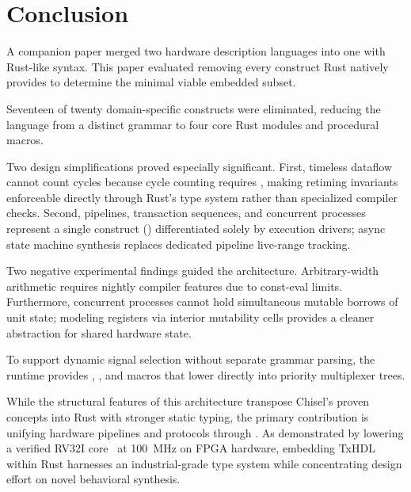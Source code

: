 \section{Conclusion}
\label{sec:e-conclusion}

A companion paper merged two hardware description languages into one with
Rust-like syntax. This paper evaluated removing every construct Rust natively
provides to determine the minimal viable embedded subset.

Seventeen of twenty domain-specific constructs were eliminated, reducing the
language from a distinct grammar to four core Rust modules and procedural macros.

Two design simplifications proved especially significant. First, timeless dataflow
cannot count cycles because cycle counting requires , making
retiming invariants enforceable directly through Rust's type system rather than
specialized compiler checks. Second, pipelines, transaction sequences, and
concurrent processes represent a single construct () differentiated
solely by execution drivers; async state machine synthesis replaces dedicated
pipeline live-range tracking.

Two negative experimental findings guided the architecture. Arbitrary-width
arithmetic requires nightly compiler features due to const-eval limits. Furthermore,
concurrent processes cannot hold simultaneous mutable borrows of unit state;
modeling registers via interior mutability cells provides a cleaner abstraction
for shared hardware state.

To support dynamic signal selection without separate grammar parsing, the
runtime provides , , and  macros that
lower directly into priority multiplexer trees.

While the structural features of this architecture transpose Chisel's
proven concepts into Rust with stronger static typing, the primary contribution
is unifying hardware pipelines and protocols through . As
demonstrated by lowering a verified RV32I core~\cite{vreteno} at 100~MHz on
FPGA hardware, embedding TxHDL within Rust harnesses an industrial-grade type
system while concentrating design effort on novel behavioral synthesis.
